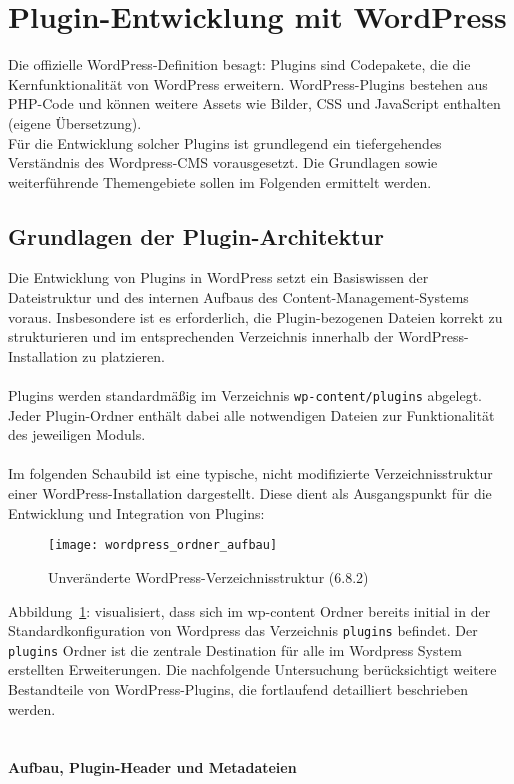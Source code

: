 \section{Plugin-Entwicklung mit WordPress}

Die offizielle WordPress-Definition besagt: \glqq Plugins sind Codepakete, die die Kernfunktionalität von WordPress erweitern.
WordPress-Plugins bestehen aus PHP-Code und können weitere Assets wie Bilder,
CSS und JavaScript enthalten\grqq{} \cite{wordpress2024plugin} (eigene Übersetzung).
\\
Für die Entwicklung solcher Plugins ist grundlegend ein tiefergehendes Verständnis des Wordpress-CMS vorausgesetzt.
Die Grundlagen sowie weiterführende Themengebiete sollen im Folgenden ermittelt werden.



\subsection{Grundlagen der Plugin-Architektur}

Die Entwicklung von Plugins in WordPress setzt ein Basiswissen der Dateistruktur und des internen Aufbaus des Content-Management-Systems voraus.
Insbesondere ist es erforderlich, die Plugin-bezogenen Dateien korrekt zu strukturieren und im entsprechenden Verzeichnis innerhalb der WordPress-Installation zu platzieren.\\\\
Plugins werden standardmäßig im Verzeichnis \texttt{wp-content/plugins} abgelegt.
Jeder Plugin-Ordner enthält dabei alle notwendigen Dateien zur Funktionalität des jeweiligen Moduls.\\\\
Im folgenden Schaubild ist eine typische, nicht modifizierte Verzeichnisstruktur einer WordPress-Installation dargestellt.
Diese dient als Ausgangspunkt für die Entwicklung und Integration von Plugins:

\begin{figure}[tbh]
 \centering
 \texttt{[image: wordpress\_ordner\_aufbau]}
 \caption{Unveränderte WordPress-Verzeichnisstruktur (6.8.2)}
 \label{fig:wordpress-verzeichnis}
\end{figure}
\newpage
Abbildung~\ref{fig:wordpress-verzeichnis}: visualisiert, dass sich im wp-content Ordner bereits initial in der Standardkonfiguration von Wordpress das Verzeichnis \texttt{plugins} befindet.
Der \texttt{plugins} Ordner ist die zentrale Destination für alle im Wordpress System erstellten Erweiterungen.
Die nachfolgende Untersuchung berücksichtigt weitere Bestandteile von WordPress-Plugins, die fortlaufend detailliert beschrieben werden.
\\\\\\
\textbf{Aufbau, Plugin-Header und Metadateien}

